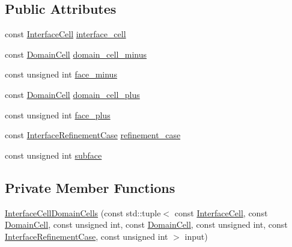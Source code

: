 \subsection*{Public Attributes}
\begin{DoxyCompactItemize}
\item 
const \hyperlink{class_interface_cell_domain_cells_ac6c8ada1cde14364575ef0191a278bf8}{Interface\+Cell} \hyperlink{class_interface_cell_domain_cells_acabc5a62be3f7742c3c334ae1777fbd5}{interface\+\_\+cell}
\item 
const \hyperlink{class_interface_cell_domain_cells_aea8f8f65d0f5021da9c5b8e147b6d587}{Domain\+Cell} \hyperlink{class_interface_cell_domain_cells_ae610a6a7b0ff4a421ee051cb873bbc22}{domain\+\_\+cell\+\_\+minus}
\item 
const unsigned int \hyperlink{class_interface_cell_domain_cells_a51a9eaf54de991f5fa432220b09205cd}{face\+\_\+minus}
\item 
const \hyperlink{class_interface_cell_domain_cells_aea8f8f65d0f5021da9c5b8e147b6d587}{Domain\+Cell} \hyperlink{class_interface_cell_domain_cells_a72c7faaed3a84c546d47960f1064f9df}{domain\+\_\+cell\+\_\+plus}
\item 
const unsigned int \hyperlink{class_interface_cell_domain_cells_a8780275f79c7137ef65df9b7d4039017}{face\+\_\+plus}
\item 
const \hyperlink{triangulation__system_8h_a4cfb8c5e21535951e919b6a6b1023af7}{Interface\+Refinement\+Case} \hyperlink{class_interface_cell_domain_cells_ab1b5469ca5c40256942ea179abbba92c}{refinement\+\_\+case}
\item 
const unsigned int \hyperlink{class_interface_cell_domain_cells_aba7f3e048c6985006988d716cb31aa7d}{subface}
\end{DoxyCompactItemize}
\subsection*{Private Member Functions}
\begin{DoxyCompactItemize}
\item 
\hyperlink{class_interface_cell_domain_cells_a4c0fd73a697833a1257b9341982897de}{Interface\+Cell\+Domain\+Cells} (const std\+::tuple$<$ const \hyperlink{class_interface_cell_domain_cells_ac6c8ada1cde14364575ef0191a278bf8}{Interface\+Cell}, const \hyperlink{class_interface_cell_domain_cells_aea8f8f65d0f5021da9c5b8e147b6d587}{Domain\+Cell}, const unsigned int, const \hyperlink{class_interface_cell_domain_cells_aea8f8f65d0f5021da9c5b8e147b6d587}{Domain\+Cell}, const unsigned int, const \hyperlink{triangulation__system_8h_a4cfb8c5e21535951e919b6a6b1023af7}{Interface\+Refinement\+Case}, const unsigned int $>$ input)
\end{DoxyCompactItemize}
